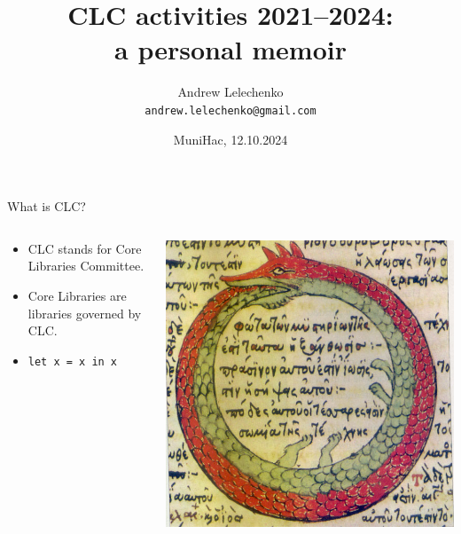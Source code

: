 \documentclass[handout]{beamer}
\title[CLC 2021--2024]{{CLC activities 2021--2024:} \\ a personal memoir}
\author[Andrew Lelechenko]{Andrew Lelechenko \\ \texttt{andrew.lelechenko@gmail.com}}
\date{MuniHac, 12.10.2024}
\begin{document}
\begin{frame}
  \titlepage

\end{frame}

\begin{frame}{What is CLC?}

\begin{columns}[T]
  \begin{column}{.45\textwidth}

\bigskip\bigskip

\begin{itemize}[<+->]
\item CLC stands for Core Libraries Committee.

\bigskip\bigskip

\item Core Libraries are libraries governed by CLC.

\bigskip\bigskip

\item {\tt let x = x in x}
\end{itemize}

\end{column}

\begin{column}{.55\textwidth}
  \includegraphics[width=\textwidth]{uroboros.jpg}
\end{column}

\end{columns}

\end{frame}
\end{document}
